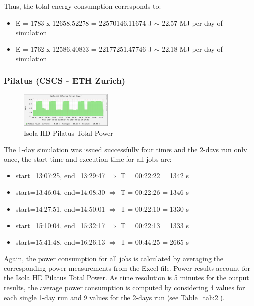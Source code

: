 Thus, the total energy consumption corresponds to: 
\begin{itemize}
\item E  = 1783 x 12658.52278  = 22570146.11674 J $\sim$  22.57 MJ per
  day of simulation
\item E  = 1762 x 12586.40833  = 22177251.47746 J $\sim$  22.18 MJ per
  day of simulation
\end{itemize}

\subsubsection{Pilatus (CSCS - ETH Zurich)}
\begin{figure}
  \includegraphics[width=0.4\textwidth]{Figs/NRJ_benchmark_Pilatus.eps}
  \caption{Isola HD Pilatus Total Power}
  \label{fig:2}
\end{figure}

The 1-day simulation was issued successfully four times and the 2-days
run only once, the start time and execution time for all jobs are:
\begin{itemize}
\item start=13:07:25, end=13:29:47 $\Rightarrow$ T = 00:22:22 = 1342 s
\item start=13:46:04, end=14:08:30 $\Rightarrow$ T = 00:22:26 = 1346 s
\item start=14:27:51, end=14:50:01 $\Rightarrow$ T = 00:22:10 = 1330 s
\item start=15:10:04, end=15:32:17 $\Rightarrow$ T = 00:22:13 = 1333 s
\item start=15:41:48, end=16:26:13 $\Rightarrow$ T = 00:44:25 = 2665 s
\end{itemize}

Again, the power  consumption for all jobs is  calculated by averaging
the  corresponding  power  measurements  from the  Excel  file.  Power
results  account  for  the  Isola  HD Pilatus  Total  Power.  As  time
resolution  is 5  minutes for  the output  results, the  average power
consumption is computed by considering  4 values for each single 1-day
run and 9 values for the 2-days run (see Table~\ref{tab:2}).

